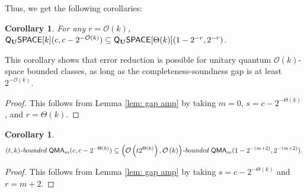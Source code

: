 \documentclass[11pt]{article}
\newtheorem{corollary}[theorem]{Corollary}
\theoremstyle{definition}
\theoremstyle{remark}
\newcommand\QMA{{\sf{QMA}}}
\newcommand\bddQMA[5]{{\left(#1,#2\right)}\textit{-bounded }\QMA_{#3}(#4,#5)}
\newcommand{\classfont}{\sf}
\newcommand{\Unitary}{\mathbf{U}}
\newcommand{\unitaryQSPACE}[3]{{\classfont{Q}_\Unitary\classfont{SPACE}}[#1](#2,#3)}
\newcommand\bigoh{\mathcal{O}}
\begin{document}
Thus, we get the following corollaries:
\begin{corollary} \label{obvious2} For any $r = \mathcal{O}(k)$,
$
\unitaryQSPACE{k}{c}{c-2^{-\bigoh (k)}} \subseteq
\unitaryQSPACE{\Theta(k)}{1-2^{-r}}{2^{-r}}$.
\end{corollary}
This corollary shows that error reduction is possible for unitary quantum $\bigoh(k)$-space bounded classes, as long as the completeness-soundness gap is at least $2^{-\bigoh (k)}$.
\begin{proof}
This follows from Lemma \ref{lem: gap amp} by taking $m=0$, $s = c-2^{-\Theta(k)}$, and $r = \Theta(k)$.
\end{proof}
\begin{corollary}\label{obvious1}
\[
\bddQMA{t}{k}{m}{c}{c-2^{-\Theta(k)}}\subseteq\bddQMA{\mathcal{O}\left(t2^{\Theta(k)}\right)}{\mathcal{O}\left(k\right)}{m}{1-2^{-(m+2)}}{2^{-(m+2)}}.
\]
\end{corollary}
\begin{proof}
This follows from Lemma \ref{lem: gap amp} by taking $s = c-2^{-\Theta(k)}$ and $r = m+2$.
\end{proof}
\end{document}

